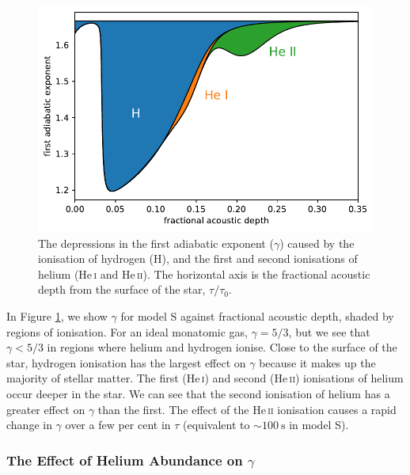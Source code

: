 \begin{figure}[tb]
    \centering
    \includegraphics{figures/adiabatic-ionisation-regions.pdf}
    \caption[The depressions in the first adiabatic exponent caused by the ionisation of hydrogen and helium.]{The depressions in the first adiabatic exponent (\(\gamma\)) caused by the ionisation of hydrogen (H), and the first and second ionisations of helium (He\,\textsc{i} and He\,\textsc{ii}). The horizontal axis is the fractional acoustic depth from the surface of the star, \(\tau/\tau_0\).}
    \label{fig:gamma-zones}
\end{figure}

In Figure \ref{fig:gamma-zones}, we show \(\gamma\) for model S against fractional acoustic depth, shaded by regions of ionisation. For an ideal monatomic gas, \(\gamma=5/3\), but we see that \(\gamma < 5/3\) in regions where helium and hydrogen ionise. Close to the surface of the star, hydrogen ionisation has the largest effect on \(\gamma\) because it makes up the majority of stellar matter. The first (He\,\textsc{i}) and second (He\,\textsc{ii}) ionisations of helium occur deeper in the star. We can see that the second ionisation of helium has a greater effect on \(\gamma\) than the first. The effect of the He\,\textsc{ii} ionisation causes a rapid change in \(\gamma\) over a few per cent in \(\tau\) (equivalent to \(\sim \SI{100}{\second}\) in model S).

\subsubsection{The Effect of Helium Abundance on \(\gamma\)}

